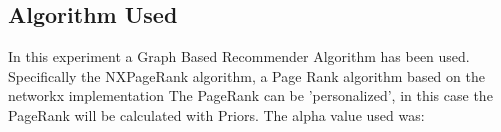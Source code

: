 \documentclass[12pt, a4paper]{article}
\begin{document}



\subsection{Algorithm Used}
In this experiment a Graph Based Recommender Algorithm has been used.
Specifically the NXPageRank algorithm, a Page Rank algorithm based on the networkx implementation
The PageRank can be 'personalized', in this case the PageRank will be calculated with Priors.
The alpha value used was: 



\end{document}
